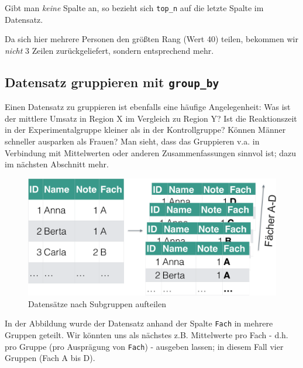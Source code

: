 \documentclass[12pt,]{book}
\begin{document}
Gibt man \emph{keine} Spalte an, so bezieht sich \texttt{top\_n} auf die
letzte Spalte im Datensatz.

Da sich hier mehrere Personen den größten Rang (Wert 40) teilen,
bekommen wir \emph{nicht} 3 Zeilen zurückgeliefert, sondern entsprechend
mehr.

\subsection{\texorpdfstring{Datensatz gruppieren mit
\texttt{group\_by}}{Datensatz gruppieren mit group\_by}}\label{datensatz-gruppieren-mit-group_by}

Einen Datensatz zu gruppieren ist ebenfalls eine häufige Angelegenheit:
Was ist der mittlere Umsatz in Region X im Vergleich zu Region Y? Ist
die Reaktionszeit in der Experimentalgruppe kleiner als in der
Kontrollgruppe? Können Männer schneller ausparken als Frauen? Man sieht,
dass das Gruppieren v.a. in Verbindung mit Mittelwerten oder anderen
Zusammenfassungen sinnvol ist; dazu im nächsten Abschnitt mehr.

\begin{figure}

{\centering \includegraphics[width=0.7\linewidth]{./images/group_by} 

}

\caption{Datensätze nach Subgruppen aufteilen}\label{fig:fig-groupby}
\end{figure}

In der Abbildung wurde der Datensatz anhand der Spalte \texttt{Fach} in
mehrere Gruppen geteilt. Wir könnten uns als nächstes z.B. Mittelwerte
pro Fach - d.h. pro Gruppe (pro Ausprägung von \texttt{Fach}) - ausgeben
lassen; in diesem Fall vier Gruppen (Fach A bis D).
\end{document}
